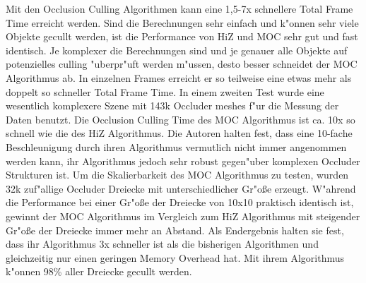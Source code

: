 \documentclass[journal]{vgtc}
\begin{document}
Mit den Occlusion Culling Algorithmen kann eine 1,5-7x schnellere Total Frame Time erreicht werden.
Sind die Berechnungen sehr einfach und k"onnen sehr viele Objekte gecullt werden, ist die Performance von HiZ und MOC sehr gut und fast identisch.
Je komplexer die Berechnungen sind und je genauer alle Objekte auf potenzielles culling "uberpr"uft werden m"ussen, desto besser schneidet der MOC Algorithmus ab.
In einzelnen Frames erreicht er so teilweise eine etwas mehr als doppelt so schneller Total Frame Time.
In einem zweiten Test wurde eine wesentlich komplexere Szene mit 143k Occluder meshes f"ur die Messung der Daten benutzt.
Die Occlusion Culling Time des MOC Algorithmus ist ca. 10x so schnell wie die des HiZ Algorithmus.
Die Autoren halten fest, dass eine 10-fache Beschleunigung durch ihren Algorithmus vermutlich nicht immer angenommen werden kann, ihr Algorithmus jedoch sehr robust gegen"uber komplexen Occluder Strukturen ist.
Um die Skalierbarkeit des MOC Algorithmus zu testen, wurden 32k zuf"allige Occluder Dreiecke mit unterschiedlicher Gr"o\ss{}e erzeugt.
W"ahrend die Performance bei einer Gr"o\ss{}e der Dreiecke von 10x10 praktisch identisch ist, gewinnt der MOC Algorithmus im Vergleich zum HiZ Algorithmus mit steigender Gr"o\ss{}e der Dreiecke immer mehr an Abstand.
Als Endergebnis halten sie fest, dass ihr Algorithmus 3x schneller ist als die bisherigen Algorithmen und gleichzeitig nur einen geringen Memory Overhead hat.
Mit ihrem Algorithmus k"onnen 98\% aller Dreiecke gecullt werden.\\
\end{document}
